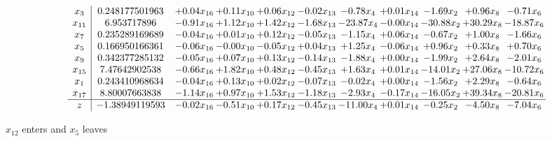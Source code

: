 \documentclass[9pt]{article}
\begin{document}
 \[\begin{array}{c| c c@{\hskip 2pt} c@{\hskip 2pt} c@{\hskip 2pt} c@{\hskip 2pt} c@{\hskip 2pt} c@{\hskip 2pt} c@{\hskip 2pt} c@{\hskip 2pt} c@{\hskip 2pt} }
 x_{3}   &  0.248177501963 & +  0.04 x_{16} & +  0.11 x_{10} & +  0.06 x_{12} & -0.02 x_{13} & -0.78 x_{4} & +  0.01 x_{14} & -1.69 x_{2} & +  0.96 x_{8} & -0.71 x_{6}\\
 x_{11}   &  6.953717896 & -0.91 x_{16} & +  1.12 x_{10} & +  1.42 x_{12} & -1.68 x_{13} & -23.87 x_{4} & -0.00 x_{14} & -30.88 x_{2} & + 30.29 x_{8} & -18.87 x_{6}\\
 x_{7}   &  0.235289169689 & -0.04 x_{16} & +  0.01 x_{10} & +  0.12 x_{12} & -0.05 x_{13} & -1.15 x_{4} & +  0.06 x_{14} & -0.67 x_{2} & +  1.00 x_{8} & -1.66 x_{6}\\
 x_{5}   &  0.166950166361 & -0.06 x_{16} & -0.00 x_{10} & -0.05 x_{12} & +  0.04 x_{13} & +  1.25 x_{4} & -0.06 x_{14} & +  0.96 x_{2} & +  0.33 x_{8} & +  0.70 x_{6}\\
 x_{9}   &  0.342377285132 & -0.05 x_{16} & +  0.07 x_{10} & +  0.13 x_{12} & -0.14 x_{13} & -1.88 x_{4} & +  0.00 x_{14} & -1.99 x_{2} & +  2.64 x_{8} & -2.01 x_{6}\\
 x_{15}   &  7.47642902538 & -0.66 x_{16} & +  1.82 x_{10} & +  0.48 x_{12} & -0.45 x_{13} & +  1.63 x_{4} & +  0.01 x_{14} & -14.01 x_{2} & + 27.06 x_{8} & -10.72 x_{6}\\
 x_{1}   &  0.243410968634 & -0.04 x_{16} & +  0.13 x_{10} & +  0.02 x_{12} & -0.07 x_{13} & -0.02 x_{4} & +  0.00 x_{14} & -1.56 x_{2} & +  2.29 x_{8} & -0.64 x_{6}\\
 x_{17}   &  8.80007663838 & -1.14 x_{16} & +  0.97 x_{10} & +  1.53 x_{12} & -1.18 x_{13} & -2.93 x_{4} & -0.17 x_{14} & -16.05 x_{2} & + 39.34 x_{8} & -20.81 x_{6}\\
\hline
z    &  -1.38949119593 & -0.02 x_{16} & -0.51 x_{10} & +  0.17 x_{12} & -0.45 x_{13} & -11.00 x_{4} & +  0.01 x_{14} & -0.25 x_{2} & -4.50 x_{8} & -7.04 x_{6}\\
\end{array}\]


 $ x_{12} $ enters and $ x_{5} $ leaves 
\end{document}

